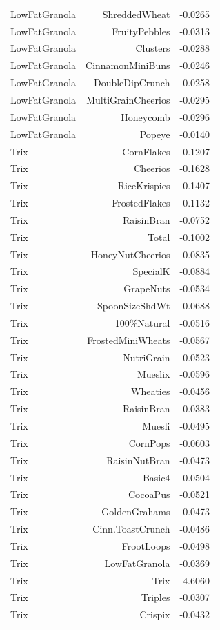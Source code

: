 \begin{longtable}{@{}lrr@{}}
LowFatGranola & ShreddedWheat & -0.0265 \\
LowFatGranola & FruityPebbles & -0.0313 \\
LowFatGranola & Clusters & -0.0288 \\
LowFatGranola & CinnamonMiniBuns & -0.0246 \\
LowFatGranola & DoubleDipCrunch & -0.0258 \\
LowFatGranola & MultiGrainCheerios & -0.0295 \\
LowFatGranola & Honeycomb & -0.0296 \\
LowFatGranola & Popeye & -0.0140 \\
Trix & CornFlakes & -0.1207 \\
Trix & Cheerios & -0.1628 \\
Trix & RiceKrispies & -0.1407 \\
Trix & FrostedFlakes & -0.1132 \\
Trix & RaisinBran & -0.0752 \\
Trix & Total & -0.1002 \\
Trix & HoneyNutCheerios & -0.0835 \\
Trix & SpecialK & -0.0884 \\
Trix & GrapeNuts & -0.0534 \\
Trix & SpoonSizeShdWt & -0.0688 \\
Trix & 100\%Natural & -0.0516 \\
Trix & FrostedMiniWheats & -0.0567 \\
Trix & NutriGrain & -0.0523 \\
Trix & Mueslix & -0.0596 \\
Trix & Wheaties & -0.0456 \\
Trix & RaisinBran & -0.0383 \\
Trix & Muesli & -0.0495 \\
Trix & CornPops & -0.0603 \\
Trix & RaisinNutBran & -0.0473 \\
Trix & Basic4 & -0.0504 \\
Trix & CocoaPus & -0.0521 \\
Trix & GoldenGrahams & -0.0473 \\
Trix & Cinn.ToastCrunch & -0.0486 \\
Trix & FrootLoops & -0.0498 \\
Trix & LowFatGranola & -0.0369 \\
Trix & Trix & 4.6060 \\
Trix & Triples & -0.0307 \\
Trix & Crispix & -0.0432 \\

\end{longtable}
